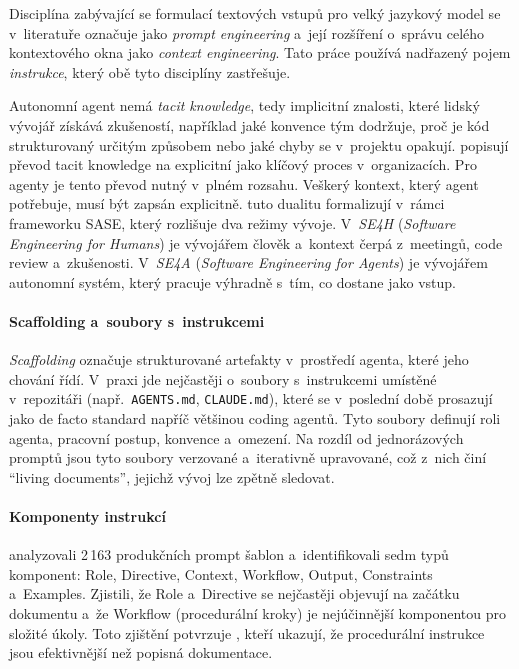 Disciplína zabývající se formulací textových vstupů pro velký
jazykový model se v~literatuře označuje jako \textit{prompt
engineering} a~její rozšíření o~správu celého kontextového okna
jako \textit{context engineering}. Tato práce používá nadřazený
pojem \textit{instrukce}, který obě tyto disciplíny zastřešuje.

Autonomní agent nemá \textit{tacit knowledge}, tedy implicitní znalosti, které
lidský vývojář získává zkušeností, například jaké konvence tým dodržuje, proč
je kód strukturovaný určitým způsobem nebo jaké chyby se v~projektu
opakují. \textcite{nonaka1995} popisují převod tacit
knowledge na explicitní jako klíčový proces v~organizacích. Pro
agenty je tento převod nutný v~plném rozsahu. Veškerý kontext, který
agent potřebuje, musí být zapsán explicitně. \textcite{hassan2025sase} tuto dualitu formalizují v~rámci
frameworku SASE, který rozlišuje dva režimy vývoje. V~\textit{SE4H}
(\textit{Software Engineering for Humans}) je vývojářem člověk
a~kontext čerpá z~meetingů, code review a~zkušenosti. V~\textit{SE4A}
(\textit{Software Engineering for Agents}) je vývojářem autonomní
systém, který pracuje výhradně s~tím, co dostane jako vstup.

\paragraph{Scaffolding a~soubory s~instrukcemi}
\textit{Scaffolding} označuje strukturované artefakty v~prostředí
agenta, které jeho chování řídí. V~praxi jde nejčastěji
o~soubory s~instrukcemi umístěné v~repozitáři
(např.\ \texttt{AGENTS.md}, \texttt{CLAUDE.md}), které se v~poslední
době prosazují jako de facto standard napříč většinou coding agentů.
Tyto soubory definují roli agenta, pracovní postup, konvence
a~omezení. Na rozdíl od
jednorázových promptů jsou tyto soubory verzované a~iterativně
upravované, což z~nich činí \enquote{living documents}, jejichž vývoj
lze zpětně sledovat.

\paragraph{Komponenty instrukcí}
\textcite{mao2025fse} analyzovali 2\,163 produkčních
prompt šablon a~identifikovali sedm typů komponent: Role,
Directive, Context, Workflow, Output, Constraints a~Examples.
Zjistili, že Role a~Directive se nejčastěji objevují na začátku
dokumentu a~že Workflow (procedurální kroky) je nejúčinnější
komponentou pro složité úkoly. Toto zjištění potvrzuje
\textcite{skillsbench2025}, kteří ukazují, že procedurální
instrukce jsou efektivnější než popisná dokumentace.


